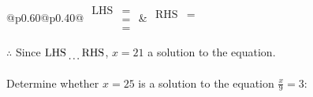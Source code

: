 \documentclass[12pt]{article}
\newcounter{minipagecount}
\begin{document}
\begin{multicols}{2}
\begin{minipage}[t]{0.40\textwidth}
    \noindent
    \renewcommand{\arraystretch}{1.3} %
    \begin{tabular}{@{}p{0.60\linewidth}@{}p{0.40\linewidth}@{}}
        \(\begin{aligned}
            \text{LHS} &=  \\
                    &=  \\
                    &= 
        \end{aligned}\) &
        \(\begin{aligned}
            \text{RHS} &= \\
                    & \\
                    &
        \end{aligned}\)
    \end{tabular}
    \renewcommand{\arraystretch}{1.0} %
    \vspace{2pt}  %

    \noindent \(\therefore\) Since \(\text{LHS} \dotuline{\hspace{5mm}} \text{RHS}\), \(x = 21\) \dotuline{\hspace{12mm}} a solution to the equation.

\end{minipage}

\vspace*{0.5ex}
\vfill{}
\newpage
\noindent{(\theminipagecount)}\hspace{0.1mm} %
\begin{minipage}[t]{0.40\textwidth} %

    \noindent Determine whether \(x = 25\) is a solution to the equation \(\frac{x}{9} = 3\):
    \vspace{2pt}  %


\end{minipage}
\end{multicols}
\end{document}
